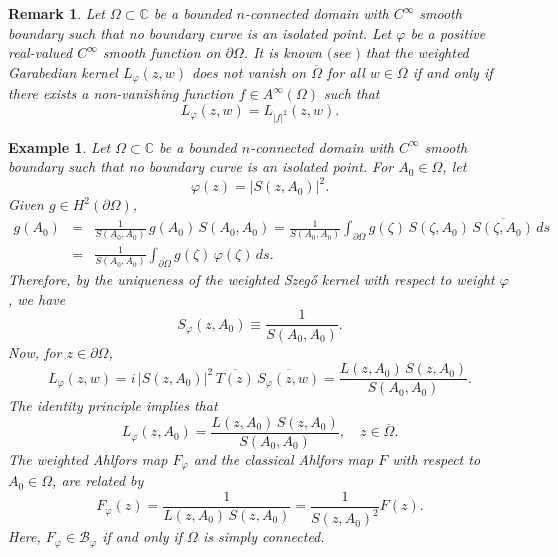\documentclass[11pt, reqno]{amsart}
\newtheorem{rem}[thm]{Remark}
\newtheorem{exam}[thm]{Example}
\numberwithin{equation}{section}
\newcommand{\ov}{\overline}
\newcommand{\Om}{\Omega}
\begin{document}
	\begin{rem}
		Let $\Omega\subset\mathbb{C}$ be a bounded $n$-connected domain with $C^{\infty}$ smooth boundary such that no boundary curve is an isolated point. Let $\varphi$ be a positive real-valued $C^{\infty}$ smooth function on $\partial\Om$. It is known $($see \cite{UM, U-S}$)$ that the weighted Garabedian kernel $L_{\varphi}(z,w)$ does not vanish on $\overline{\Om}$ for all $w\in \Om$ if and only if there exists a non-vanishing function $f\in A^{\infty}(\Om)$ such that 
		\[
		L_{\varphi}(z,w) = L_{\vert f\vert^2}(z,w).
		\]
	\end{rem}
	
	\begin{exam}
		Let $\Omega\subset\mathbb{C}$ be a bounded $n$-connected domain with $C^{\infty}$ smooth boundary such that no boundary curve is an isolated point. For $A_0\in\Om$, let 
		\[
		\varphi(z) = \vert S(z,A_0)\vert^2.
		\]
		Given $g\in H^2(\partial\Omega)$,
		\begin{eqnarray*}
			g(A_0) 
			&=&
			\frac{1}{S(A_0,A_0)} \, g(A_0) \, S(A_0,A_0)
			=
			\frac{1}{S(A_0,A_0)} \int_{\partial\Om} g(\zeta) \, S(\zeta,A_0) \,\overline{S(\zeta,A_0)} \,ds
			\\&=&
			\frac{1}{S(A_0,A_0)} \int_{\partial\Om} g(\zeta) \,\varphi(\zeta) \,ds.
		\end{eqnarray*}
		Therefore, by the uniqueness of the weighted Szeg\H{o} kernel with respect to weight $\varphi$, we have
		\[
		S_{\varphi}(z,A_0) \equiv \frac{1}{S(A_0,A_0)}.
		\]
		Now, for $z\in\partial\Om$,
		\[
		L_{\varphi}(z,w) 
		=
		i \,\vert S(z,A_0)\vert^2\, \overline{T(z)}\, \overline{S_{\varphi}(z,w)} 
		=
		\frac{L(z,A_0)\,S(z,A_0)}{S(A_0,A_0)}.
		\]	
		The identity principle implies that
		\[
		L_{\varphi}(z,A_0)  = 	\frac{L(z,A_0)\,S(z,A_0)}{S(A_0,A_0)}, 
		\quad z\in\ov{\Om}.
		\]
		The weighted Ahlfors map $F_{\varphi}$ and the classical Ahlfors map $F$ with respect to $A_0\in \Om$, are related by
		\[
		F_{\varphi}(z) = \frac{1}{L(z,A_0)\,S(z,A_0)} = \frac{1}{S(z,A_0)^2} F(z).
		\]
        Here, $F_{\varphi}\in \mathcal{B}_{\varphi}$ if and only if $\Om$ is simply connected.
	\end{exam}
	
\end{document}
